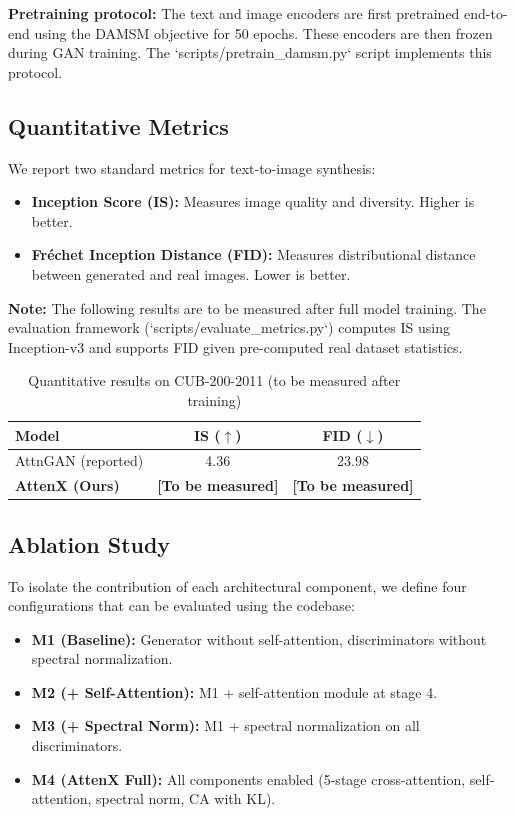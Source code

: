 \documentclass[conference]{IEEEtran}
\begin{document}
\textbf{Pretraining protocol:} The text and image encoders are first pretrained end-to-end using the DAMSM objective for 50 epochs. These encoders are then frozen during GAN training. The `scripts/pretrain\_damsm.py` script implements this protocol.

\subsection{Quantitative Metrics}
We report two standard metrics for text-to-image synthesis:
\begin{itemize}
    \item \textbf{Inception Score (IS):} Measures image quality and diversity. Higher is better.
    \item \textbf{Fr\'{e}chet Inception Distance (FID):} Measures distributional distance between generated and real images. Lower is better.
\end{itemize}

\textbf{Note:} The following results are to be measured after full model training. The evaluation framework (`scripts/evaluate\_metrics.py`) computes IS using Inception-v3 and supports FID given pre-computed real dataset statistics.

\begin{table}[htbp]
\caption{Quantitative results on CUB-200-2011 (to be measured after training)}
\centering
\begin{tabular}{@{}lcc@{}}
\toprule
\textbf{Model} & \textbf{IS} ($\uparrow$) & \textbf{FID} ($\downarrow$) \\
\midrule
AttnGAN (reported) & 4.36 & 23.98 \\
\textbf{AttenX (Ours)} & \textbf{[To be measured]} & \textbf{[To be measured]} \\
\bottomrule
\end{tabular}
\label{tab:results}
\end{table}

\subsection{Ablation Study}
To isolate the contribution of each architectural component, we define four configurations that can be evaluated using the codebase:

\begin{itemize}
    \item \textbf{M1 (Baseline):} Generator without self-attention, discriminators without spectral normalization.
    \item \textbf{M2 (+ Self-Attention):} M1 + self-attention module at stage 4.
    \item \textbf{M3 (+ Spectral Norm):} M1 + spectral normalization on all discriminators.
    \item \textbf{M4 (AttenX Full):} All components enabled (5-stage cross-attention, self-attention, spectral norm, CA with KL).
\end{itemize}
\end{document}
